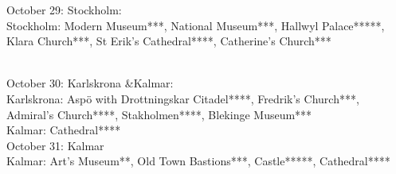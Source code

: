 October 29: Stockholm:\\

Stockholm: Modern Museum***, National Museum***, Hallwyl Palace*****, Klara Church***, St Erik's Cathedral****, Catherine's Church***\\\

October 30: Karlskrona \&Kalmar:\\

Karlskrona: Asp\"o with Drottningskar Citadel****, Fredrik's Church***, Admiral's Church****, Stakholmen****, Blekinge Museum***\\
Kalmar: Cathedral****\\

October 31: Kalmar\\

Kalmar: Art's Museum**, Old Town Bastions***, Castle*****, Cathedral****\\\

